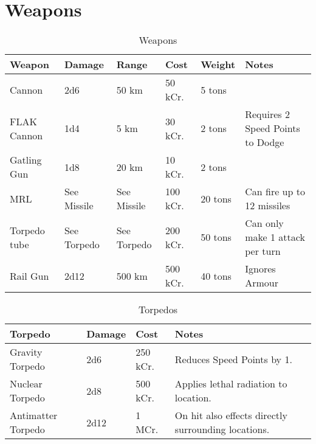 \section{Weapons}
\label{sec:Weapons}

\begin{table}[H]
  \centering
  \caption{Weapons}
  \label{tab:vessel-weapons}
  \begin{tabularx}{\textwidth}{|l|l|l|l|l|X|}
    \hline
    Weapon       & Damage      & Range       & Cost & Weight  & Notes                            \\ \hline
    Cannon       & 2d6         & 50 km       & 50 kCr.    & 5 tons  & ~                                \\ \hline
    FLAK Cannon  & 1d4         & 5 km        & 30 kCr.    & 2 tons   & Requires 2 Speed Points to Dodge \\ \hline
    Gatling Gun  & 1d8         & 20 km       & 10 kCr.    & 2 tons   & ~      \\ \hline
    MRL          & See Missile & See Missile & 100 kCr.    & 20 tons & Can fire up to 12 missiles       \\ \hline
    Torpedo tube & See Torpedo & See Torpedo & 200 kCr.    & 50 tons & Can only make 1 attack per turn  \\ \hline
    Rail Gun     & 2d12     & 500 km      & 500 kCr.    & 40 tons & Ignores Armour                   \\ \hline
  \end{tabularx}
\end{table}

\begin{table}
  \centering
  \caption{Torpedos}
  \begin{tabularx}{\textwidth}{|l|l|l|X|}
    \hline
    Torpedo            & Damage & Cost & Notes                                               \\ \hline
    Gravity Torpedo    & 2d6   & 250 kCr. & Reduces Speed Points by 1.                          \\ \hline
    Nuclear Torpedo    & 2d8   & 500 kCr. & Applies lethal radiation to location.               \\ \hline
    Antimatter Torpedo & 2d12   & 1 MCr. & On hit also effects directly surrounding locations. \\ \hline
  \end{tabularx}
\end{table}

